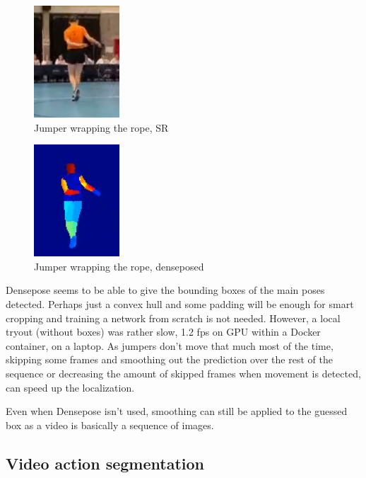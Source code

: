\begin{figure}
    \centering
    \includegraphics[width=0.3\linewidth]{img/sr_wrap}
    \caption{Jumper wrapping the rope, SR}
    \label{fig:srwrap}
\end{figure}

\begin{figure}
    \centering
    \includegraphics[width=0.3\linewidth]{img/sr_wrap_dense}
    \caption{Jumper wrapping the rope, denseposed}
    \label{fig:srwrapdense}
\end{figure}

Densepose seems to be able to give the bounding boxes of the main poses detected. Perhaps just a convex hull and some padding will be enough for smart cropping and training a network from scratch is not needed.
However, a local tryout (without boxes) was rather slow, 1.2 fps on GPU within a Docker container, on a laptop.
As jumpers don’t move that much most of the time, skipping some frames and smoothing out the prediction over the rest of the sequence or decreasing the amount of skipped frames when movement is detected, can speed up the localization.

Even when Densepose isn’t used, smoothing can still be applied to the guessed box as a video is basically a sequence of images.

\subsection{Video action segmentation}

